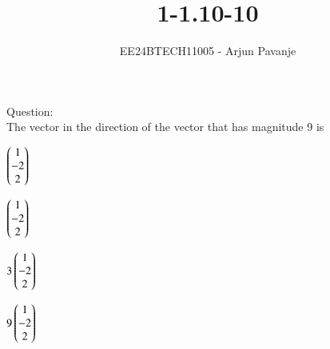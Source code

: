 \documentclass[journal]{IEEEtran}
\begin{document}

\vspace{3cm}

\title{1-1.10-10}
\author{EE24BTECH11005 - Arjun Pavanje
}
{\let\newpage\relax\maketitle}
Question:\\
The vector in the direction of the vector  that has magnitude 9 is
\begin{enumerate}
\begin{multicols}{2}
\item $\begin{pmatrix}1\\-2\\2\end{pmatrix}$
\columnbreak
\item $\begin{pmatrix}1\\-2\\2\end{pmatrix}$
\end{multicols}
\begin{multicols}{2}
	\item $3\begin{pmatrix}1\\-2\\2\end{pmatrix}$
\columnbreak
\item $9\begin{pmatrix}1\\-2\\2\end{pmatrix}$
\end{multicols}
\end{enumerate}
\end{document}
